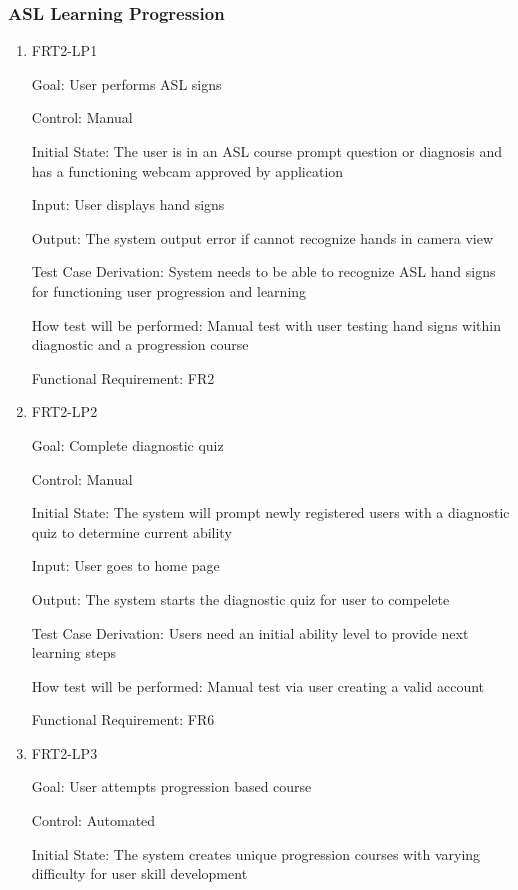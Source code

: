 \documentclass[12pt, titlepage]{article}
\begin{document}
\subsubsection{ASL Learning Progression}

\begin{enumerate}

\item{FRT2-LP1}

Goal: User performs ASL signs

Control: Manual
					
Initial State: The user is in an ASL course prompt question or diagnosis and has a functioning webcam approved by application
					
Input: User displays hand signs
					
Output: The system output error if cannot recognize hands in camera view

Test Case Derivation: System needs to be able to recognize ASL hand signs for functioning user progression and learning
					
How test will be performed: Manual test with user testing hand signs within diagnostic and a progression course

Functional Requirement: FR2

\item{FRT2-LP2}

Goal: Complete diagnostic quiz

Control: Manual
					
Initial State: The system will prompt newly registered users with a diagnostic quiz to determine current ability
					
Input: User goes to home page
					
Output: The system starts the diagnostic quiz for user to compelete

Test Case Derivation: Users need an initial ability level to provide next learning steps
					
How test will be performed: Manual test via user creating a valid account

Functional Requirement: FR6

\item{FRT2-LP3}

Goal: User attempts progression based course

Control: Automated
					
Initial State: The system creates unique progression courses with varying difficulty for user skill development
					

\end{enumerate}
\end{document}
